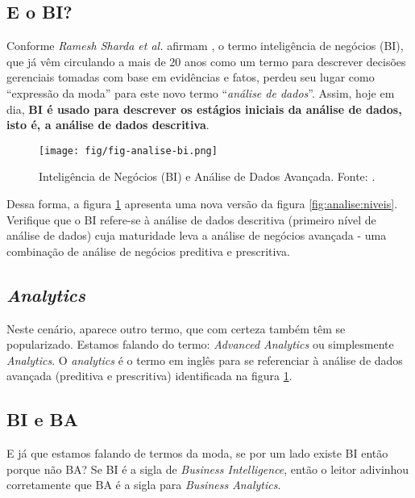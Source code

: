\subsection{E o BI?}
\label{sub-eobi}

    Conforme \emph{Ramesh Sharda et al.} afirmam \cite[153]{turban2019}, o termo inteligência de negócios (BI), que já vêm circulando a mais de 20 anos como um termo para descrever decisões gerenciais tomadas com base em evidências e fatos, perdeu seu lugar como ``expressão da moda'' para este novo termo ``\emph{análise de dados}''. Assim, hoje em dia, \textbf{BI é usado para descrever os estágios iniciais da análise de dados, isto é, a análise de dados descritiva}.
    
    \begin{figure}[h]
        \centering
        \texttt{[image: fig/fig-analise-bi.png]}
        \caption{Inteligência de Negócios (BI) e Análise de Dados Avançada. Fonte: \cite[adaptado]{turban2019}.}
        \label{fig:analise:bi}
    \end{figure}
    
    Dessa forma, a figura \ref{fig:analise:bi} apresenta uma nova versão da figura \ref{fig:analise:niveis}. Verifique que o BI refere-se à análise de dados descritiva (primeiro nível de análise de dados) cuja maturidade leva a análise de negócios avançada - uma combinação de análise de negócios preditiva e prescritiva.

\subsection{\emph{Analytics}}

    Neste cenário, aparece outro termo, que com certeza também têm se popularizado. Estamos falando do termo: \emph{Advanced Analytics} ou simplesmente  \emph{Analytics}. O \emph{analytics} é o termo em inglês para se referenciar à análise de dados avançada (preditiva e prescritiva) identificada na figura \ref{fig:analise:bi}.

\subsection{BI e BA}

    E já que estamos falando de termos da moda, se por um lado existe BI então porque não BA? Se BI é a sigla de \emph{Business Intelligence}, então o leitor adivinhou corretamente que BA é a sigla para \emph{Business Analytics}. 

